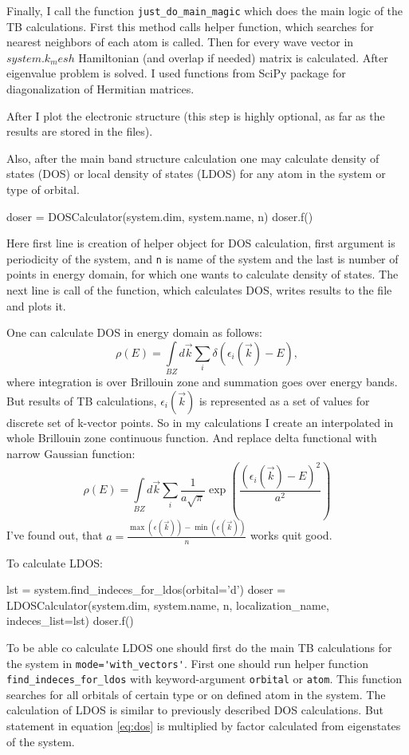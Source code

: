 Finally, I call the function \verb!just_do_main_magic! which does the main logic of the TB calculations. First this method calls helper function, which searches for nearest neighbors of each atom is called. Then for every wave vector in $system.k_mesh$ Hamiltonian (and overlap if needed) matrix is calculated. After eigenvalue problem is solved. I used functions from SciPy package for diagonalization of Hermitian matrices.

After I plot the electronic structure (this step is highly optional, as far as the results are stored in the files).

Also, after the main band structure calculation one may calculate density of states (DOS) or local density of states (LDOS) for any atom in the system or type of orbital.
\begin{python}
doser = DOSCalculator(system.dim, system.name, n)
doser.f()
\end{python}
Here first line is creation of helper object for DOS calculation, first argument is periodicity of the system, and \verb!n! is name of the system and the last is number of points in energy domain, for which one wants to calculate density of states. The next line is call of the function, which calculates DOS, writes results to the file and plots it.

One can calculate DOS in energy domain as follows: 
\begin{equation}
	\rho(E) = \int\limits_{BZ} d\vec{k} \sum\limits_i \delta(\epsilon_i(\vec{k}) - E),
\end{equation}
where integration is over Brillouin zone and summation goes over energy bands. But results of TB calculations, $\epsilon_i(\vec{k})$ is represented as a set of values for discrete set of k-vector points. So in my calculations I create an interpolated in whole Brillouin zone continuous function. And replace delta functional with narrow Gaussian function:
\begin{equation}  \label{eq:dos}
	\rho(E) = \int\limits_{BZ} d\vec{k} \sum\limits_i \frac{1}{a\sqrt{\pi}} \exp\left(\frac{(\epsilon_i(\vec{k}) - E)^2}{a^2}\right)
\end{equation}
I've found out, that $a = \frac{\max(\epsilon(\vec{k})) - \min(\epsilon(\vec{k}))}{n}$ works quit good.

To calculate LDOS:
\begin{python}
lst = system.find_indeces_for_ldos(orbital='d')
doser = LDOSCalculator(system.dim, system.name, n, localization_name, indeces_list=lst)
doser.f()
\end{python}

To be able co calculate LDOS one should first do the main TB calculations for the system in \verb!mode='with_vectors'!. First one should run helper function \verb!find_indeces_for_ldos! with keyword-argument \verb!orbital! or \verb!atom!. This function searches for all orbitals of certain type or on defined atom in the system. The calculation of LDOS is similar to previously described DOS calculations. But statement in equation \ref{eq:dos} is multiplied by factor calculated from eigenstates of the system.